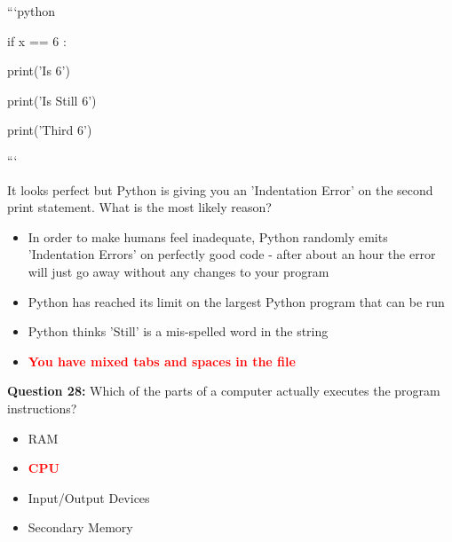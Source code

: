 \documentclass[12pt,a4paper]{article}
\begin{document}
\newline
\newline

\newline
```python\newline

\newline
if x == 6 :\newline

\newline
    print('Is 6')\newline

\newline
    print('Is Still 6')\newline

\newline
    print('Third 6')\newline

\newline
```\newline

\newline
\newline

\newline
It looks perfect but Python is giving you an 'Indentation Error' on the second print statement. What is the most likely reason?

\begin{itemize}
    \item[\textbf{A.}] In order to make humans feel inadequate, Python randomly emits 'Indentation Errors' on perfectly good code - after about an hour the error will just go away without any changes to your program
    \item[\textbf{B.}] Python has reached its limit on the largest Python program that can be run
    \item[\textbf{C.}] Python thinks 'Still' is a mis-spelled word in the string
    \item[\textbf{D.}] \textcolor{red}{\textbf{You have mixed tabs and spaces in the file}}
\end{itemize}

\vspace{0.5cm}

\textbf{Question 28:} Which of the parts of a computer actually executes the program instructions?

\begin{itemize}
    \item[\textbf{A.}] RAM
    \item[\textbf{B.}] \textcolor{red}{\textbf{CPU}}
    \item[\textbf{C.}] Input/Output Devices
    \item[\textbf{D.}] Secondary Memory
\end{itemize}
\end{document}
